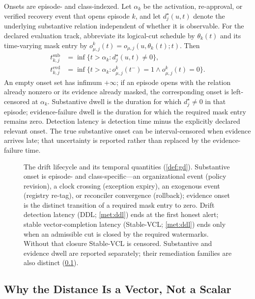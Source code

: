 \begin{definition}
Onsets are episode- and class-indexed. Let $\alpha_k$ be the activation,
re-approval, or verified recovery event that opens episode $k$, and let
$d_j^{\star}(u,t)$ denote the underlying substantive relation independent of
whether it is observable. For the declared evaluation track, abbreviate its
logical-cut schedule by $\theta_k(t)$ and its time-varying mask entry by
$o^k_{\mu,j}(t)=o_{\mu,j}(u,\theta_k(t);t)$. Then
\[
\begin{aligned}
t^{\mathrm{sub}}_{k,j}&=\inf\{t>\alpha_k:d_j^{\star}(u,t)\neq0\},\\
t^{\mathrm{evd}}_{k,j}&=\inf\{t>\alpha_k:
 o^k_{\mu,j}(t^-)=1\land o^k_{\mu,j}(t)=0\}.
\end{aligned}
\]
An empty onset set has infimum $+\infty$; if an episode opens with the
relation already nonzero or its evidence already masked, the corresponding
onset is left-censored at $\alpha_k$.
Substantive dwell is the duration for which $d_j^{\star}\neq0$ in that
episode; evidence-failure dwell is the duration for which the required mask
entry remains zero. Detection latency is detection time minus the explicitly
declared relevant onset. The true substantive onset can be interval-censored
when evidence arrives late; that uncertainty is reported rather than replaced
by the evidence-failure time.
\end{definition}

\begin{figure}[t]
\centering
\resizebox{\columnwidth}{!}{}
\caption{The drift lifecycle and its temporal quantities
(\cref{def:gd}). Substantive onset is episode- and class-specific---an
organizational event (policy revision), a clock crossing (exception expiry),
an exogenous event (registry re-tag), or reconciler convergence (rollback);
evidence onset is the distinct transition of a required mask entry to zero.
Drift detection
latency (DDL; \cref{met:ddl}) ends at the first honest alert; stable
vector-completion latency (Stable-VCL; \cref{met:ddl}) ends only when an
admissible cut is closed by the required watermarks. Without that closure
Stable-VCL is censored. Substantive and evidence dwell are reported
separately; their remediation families are also distinct
(\cref{sec:model-vector}).}
\label{fig:lifecycle}
\end{figure}

\subsection{Why the Distance Is a Vector, Not a Scalar}
\label{sec:model-vector}

